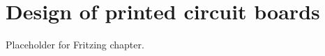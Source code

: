 \setchapterpreamble[u]{\margintoc}
\chapter{Design of printed circuit boards}

Placeholder for Fritzing chapter.